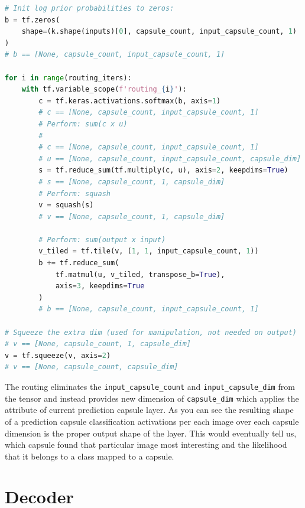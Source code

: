 \begin{lstlisting}[language=Python, caption=Prediction capsule routing]
# Init log prior probabilities to zeros:
b = tf.zeros(
    shape=(k.shape(inputs)[0], capsule_count, input_capsule_count, 1)
)
# b == [None, capsule_count, input_capsule_count, 1]

for i in range(routing_iters):
    with tf.variable_scope(f'routing_{i}'):
        c = tf.keras.activations.softmax(b, axis=1)
        # c == [None, capsule_count, input_capsule_count, 1]
        # Perform: sum(c x u)
        #
        # c == [None, capsule_count, input_capsule_count, 1]
        # u == [None, capsule_count, input_capsule_count, capsule_dim]
        s = tf.reduce_sum(tf.multiply(c, u), axis=2, keepdims=True)
        # s == [None, capsule_count, 1, capsule_dim]
        # Perform: squash
        v = squash(s)
        # v == [None, capsule_count, 1, capsule_dim]

        # Perform: sum(output x input)
        v_tiled = tf.tile(v, (1, 1, input_capsule_count, 1))
        b += tf.reduce_sum(
            tf.matmul(u, v_tiled, transpose_b=True),
            axis=3, keepdims=True
        )
        # b == [None, capsule_count, input_capsule_count, 1]

# Squeeze the extra dim (used for manipulation, not needed on output)
# v == [None, capsule_count, 1, capsule_dim]
v = tf.squeeze(v, axis=2)
# v == [None, capsule_count, capsule_dim]
\end{lstlisting}

The routing eliminates the \texttt{input\_capsule\_count} and \texttt{input\_capsule\_dim} from the tensor and instead provides new dimension of \texttt{capsule\_dim} which applies the attribute of current prediction capsule layer. As you can see the resulting shape of a prediction capsule classification activations per each image over each capsule dimension is the proper output shape of the layer. This would eventually tell us, which capsule found that particular image most interesting and the likelihood that it belongs to a class mapped to a capsule.

\section{Decoder}

